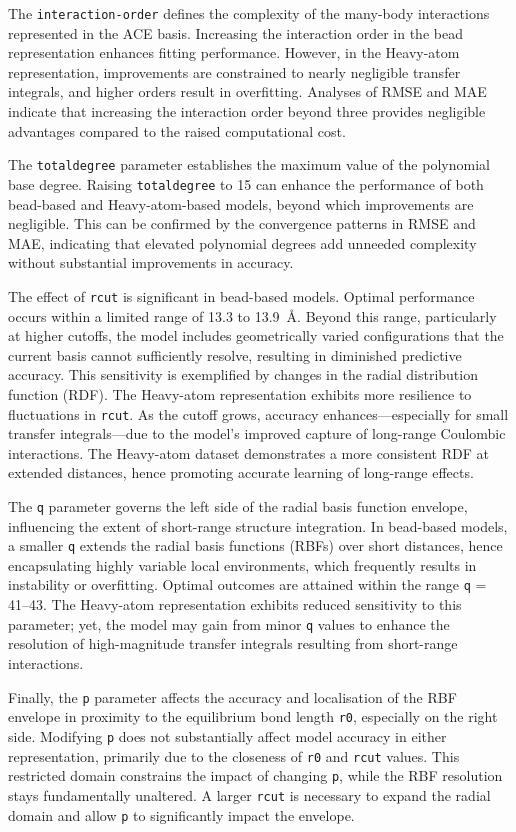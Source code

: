The \texttt{interaction-order} defines the complexity of the many-body interactions represented in the ACE basis.  Increasing the interaction order in the bead representation enhances fitting performance.  However, in the Heavy-atom representation, improvements are constrained to nearly negligible transfer integrals, and higher orders result in overfitting.  Analyses of RMSE and MAE indicate that increasing the interaction order beyond three provides negligible advantages compared to the raised computational cost.

The \texttt{totaldegree} parameter establishes the maximum value of the polynomial base degree.
Raising \texttt{totaldegree} to 15 can enhance the performance of both bead-based and Heavy-atom-based models, beyond which improvements are negligible.  This can be confirmed by the convergence patterns in RMSE and MAE, indicating that elevated polynomial degrees add unneeded complexity without substantial improvements in accuracy.

The effect of \texttt{rcut} is significant in bead-based models.  Optimal performance occurs within a limited range of 13.3 to 13.9~\AA.  Beyond this range, particularly at higher cutoffs, the model includes geometrically varied configurations that the current basis cannot sufficiently resolve, resulting in diminished predictive accuracy.  This sensitivity is exemplified by changes in the radial distribution function (RDF).  The Heavy-atom representation exhibits more resilience to fluctuations in \texttt{rcut}.  As the cutoff grows, accuracy enhances—especially for small transfer integrals—due to the model's improved capture of long-range Coulombic interactions.  The Heavy-atom dataset demonstrates a more consistent RDF at extended distances, hence promoting accurate learning of long-range effects.

The \texttt{q} parameter governs the left side of the radial basis function envelope, influencing the extent of short-range structure integration.  In bead-based models, a smaller \texttt{q} extends the radial basis functions (RBFs) over short distances, hence encapsulating highly variable local environments, which frequently results in instability or overfitting.  Optimal outcomes are attained within the range \texttt{q} = 41--43.  The Heavy-atom representation exhibits reduced sensitivity to this parameter; yet, the model may gain from minor \texttt{q} values to enhance the resolution of high-magnitude transfer integrals resulting from short-range interactions.

Finally, the \texttt{p} parameter affects the accuracy and localisation of the RBF envelope in proximity to the equilibrium bond length \texttt{r0}, especially on the right side.  Modifying \texttt{p} does not substantially affect model accuracy in either representation, primarily due to the closeness of \texttt{r0} and \texttt{rcut} values. This restricted domain constrains the impact of changing \texttt{p}, while the RBF resolution stays fundamentally unaltered.  A larger \texttt{rcut} is necessary to expand the radial domain and allow \texttt{p} to significantly impact the envelope.
